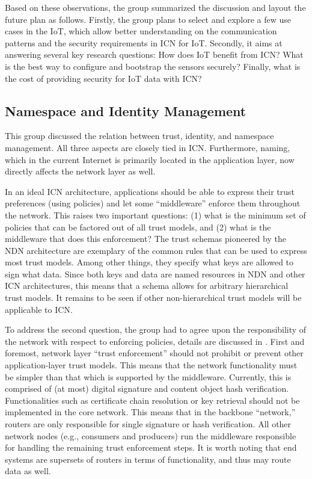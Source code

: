 Based on these observations, the group summarized the discussion and layout the future plan as follows. Firstly, the group plans to select and explore a few use cases in the IoT, which allow better understanding on the communication patterns and the security requirements in ICN for IoT. Secondly, it aims at answering several key research questions: How does IoT benefit from ICN? What is the best way to configure and bootstrap the sensors securely? Finally, what is the cost of providing security for IoT data with ICN?

\subsection{Namespace and Identity Management}
This group discussed the relation between trust, identity, and namespace management.
All three aspects are closely tied in ICN.
Furthermore, naming, which in the current Internet is primarily located in the application layer, now directly affects the network layer as well.

In an ideal ICN architecture, applications should be able to express their trust preferences (using policies) and let some ``middleware'' enforce them throughout the network. This raises two important questions: (1) what is the minimum set of policies that can be factored out of all trust models, and (2) what is the middleware that does this enforcement? The trust schemas pioneered by the NDN architecture \cite{schemas} are exemplary of the common rules that can be used to express most trust models. Among other things, they specify what keys are allowed to sign what data. Since both keys and data are named resources in NDN and other ICN architectures, this means that a schema allows for arbitrary hierarchical trust models. It remains to be seen if other non-hierarchical trust models will be applicable to ICN.

To address the second question, the group had to agree upon the responsibility of the network with respect to enforcing policies, details are discussed in \cite{trust}.
First and foremost, network layer ``trust enforcement'' should not prohibit or prevent other app\-lication-layer trust models. This means that the network functionality must be simpler than that which is supported by the middleware. Currently, this is comprised of (at most) digital signature and content object hash verification. Functionalities such as certificate chain resolution or key retrieval should not be implemented in the core network. This means that in the backbone ``network,'' routers are only responsible for single signature or hash verification. All other network nodes (e.g., consumers and producers) run the middleware responsible for handling the remaining trust enforcement steps. It is worth noting that end systems are supersets of routers in terms of functionality, and thus may route data as well.

